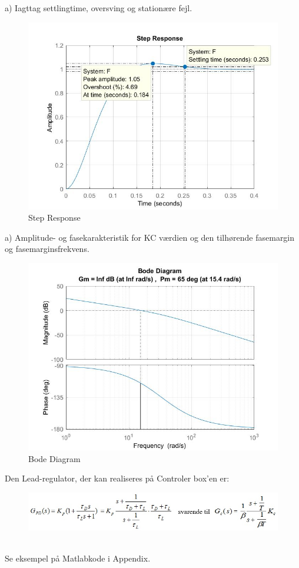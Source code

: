 \documentclass[]{report}
\begin{document}
\newline a) Iagttag settlingtime, oversving og stationære fejl.
\begin{figure} [h]
	\centering
	\includegraphics[width=0.68\linewidth]{graphics/a_steprespons}
	\caption{Step Response}
	\label{fig:asteprespons}
\end{figure}
\newline a) Amplitude- og fasekarakteristik for KC værdien og den tilhørende fasemargin og fasemarginsfrekvens. \\
\begin{figure}[h]
	\centering
	\includegraphics[width=0.68\linewidth]{graphics/a_fasekarakteristik}
	\caption{Bode Diagram}
	\label{fig:afasekarakteristik}
\end{figure}

\newpage
\noindent Den Lead-regulator, der kan realiseres på Controler box’en er:
\begin{figure}[h]
	\centering
	\includegraphics[width=1\linewidth]{graphics/lead_regulator}
	\label{fig:leadregulator}
\end{figure}
\\Se eksempel på Matlabkode i Appendix.
	
\end{document}
